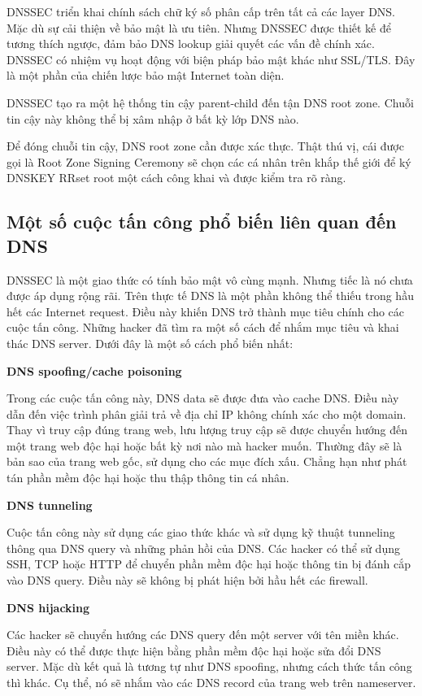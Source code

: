 \documentclass{article}
\begin{document}
DNSSEC triển khai chính sách chữ ký số phân cấp trên tất cả các layer DNS. Mặc dù sự cải thiện về bảo mật là ưu tiên. Nhưng DNSSEC được thiết kế để tương thích ngược, đảm bảo DNS lookup giải quyết các vấn đề chính xác. DNSSEC có nhiệm vụ hoạt động với biện pháp bảo mật khác như SSL/TLS. Đây là một phần của chiến lược bảo mật Internet toàn diện.

DNSSEC tạo ra một hệ thống tin cậy parent-child đến tận DNS root zone. Chuỗi tin cậy này không thể bị xâm nhập ở bất kỳ lớp DNS nào.

Để đóng chuỗi tin cậy, DNS root zone cần được xác thực. Thật thú vị, cái được gọi là Root Zone Signing Ceremony sẽ chọn các cá nhân trên khắp thế giới để ký DNSKEY RRset root một cách công khai và được kiểm tra rõ ràng.

\subsection{Một số cuộc tấn công phổ biến liên quan đến DNS}

DNSSEC là một giao thức có tính bảo mật vô cùng mạnh. Nhưng tiếc là nó chưa được áp dụng rộng rãi. Trên thực tế DNS là một phần không thể thiếu trong hầu hết các Internet request. Điều này khiến DNS trở thành mục tiêu chính cho các cuộc tấn công. Những hacker đã tìm ra một số cách để nhắm mục tiêu và khai thác DNS server. Dưới đây là một số cách phổ biến nhất:


\textbf{DNS spoofing/cache poisoning}

Trong các cuộc tấn công này, DNS data sẽ được đưa vào cache DNS. Điều này dẫn đến việc trình phân giải trả về địa chỉ IP không chính xác cho một domain. Thay vì truy cập đúng trang web, lưu lượng truy cập sẽ được chuyển hướng đến một trang web độc hại hoặc bất kỳ nơi nào mà hacker muốn. Thường đây sẽ là bản sao của trang web gốc, sử dụng cho các mục đích xấu. Chẳng hạn như phát tán phần mềm độc hại hoặc thu thập thông tin cá nhân.

\textbf{DNS tunneling}

Cuộc tấn công này sử dụng các giao thức khác và sử dụng kỹ thuật tunneling thông qua DNS query và những phản hồi của DNS. Các hacker có thể sử dụng SSH, TCP hoặc HTTP để chuyển phần mềm độc hại hoặc thông tin bị đánh cắp vào DNS query. Điều này sẽ không bị phát hiện bởi hầu hết các firewall.

\textbf{DNS hijacking}

Các hacker sẽ chuyển hướng các DNS query đến một server với tên miền khác. Điều này có thể được thực hiện bằng phần mềm độc hại hoặc sửa đổi DNS server. Mặc dù kết quả là tương tự như DNS spoofing, nhưng cách thức tấn công thì khác. Cụ thể, nó sẽ nhắm vào các DNS record của trang web trên nameserver.
\end{document}

